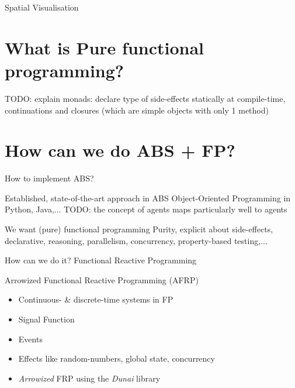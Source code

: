 \documentclass{beamer}
\begin{document}
\begin{frame}{Spatial Visualisation}
\end{frame}

\section{What is Pure functional programming?}
TODO: explain monads: declare type of side-effects statically at compile-time, continuations and closures (which are simple objects with only 1 method)

\section{How can we do ABS + FP?}
\begin{frame}{How to implement ABS?}
  \begin{block}{Established, state-of-the-art approach in ABS}
	Object-Oriented Programming in Python, Java,...
	TODO: the concept of agents maps particularly well to agents
  \end{block}
  
  \begin{block}{We want (pure) functional programming}
	Purity, explicit about side-effects, declarative, reasoning, parallelism, concurrency, property-based testing,...
  \end{block}
  
  \begin{block}{How can we do it?}
  	Functional Reactive Programming
  \end{block}
\end{frame}

\begin{frame}{Arrowized Functional Reactive Programming (AFRP)}
  \begin{itemize}
    \item Continuous- \& discrete-time systems in FP
 	\item Signal Function 
 	\item Events
 	\item Effects like random-numbers, global state, concurrency
 	\item \textit{Arrowized} FRP using the \textit{Dunai} library
  \end{itemize}
\end{frame}
\end{document}
